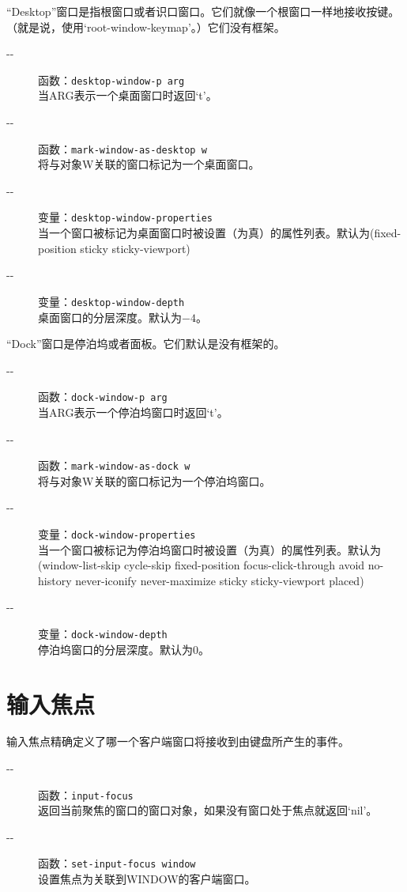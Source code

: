 \documentclass{book}
\begin{document}
\begin{CJK*}{UTF8}{gbsn}
``Desktop''窗口是指根窗口或者识口窗口。它们就像一个根窗口一样地接收按键。（就是说，使用`root-window-keymap'。）它们没有框架。
\begin{description}
\item[-{}-] 函数：\verb|desktop-window-p arg|\\
当ARG表示一个桌面窗口时返回`t'。
\item[-{}-] 函数：\verb|mark-window-as-desktop w|\\
将与对象W关联的窗口标记为一个桌面窗口。
\item[-{}-] 变量：\verb|desktop-window-properties|\\
当一个窗口被标记为桌面窗口时被设置（为真）的属性列表。默认为(fixed-position sticky sticky-viewport)
\item[-{}-] 变量：\verb|desktop-window-depth|\\
桌面窗口的分层深度。默认为$-4$。
\end{description}

``Dock''窗口是停泊坞或者面板。它们默认是没有框架的。
\begin{description}
\item[-{}-] 函数：\verb|dock-window-p arg|\\
当ARG表示一个停泊坞窗口时返回`t'。
\item[-{}-] 函数：\verb|mark-window-as-dock w|\\
将与对象W关联的窗口标记为一个停泊坞窗口。
\item[-{}-] 变量：\verb|dock-window-properties|\\
当一个窗口被标记为停泊坞窗口时被设置（为真）的属性列表。默认为(window-list-skip cycle-skip fixed-position focus-click-through avoid no-history never-iconify never-maximize sticky sticky-viewport placed)
\item[-{}-] 变量：\verb|dock-window-depth|\\
停泊坞窗口的分层深度。默认为0。
\end{description}
\section{输入焦点}
输入焦点精确定义了哪一个客户端窗口将接收到由键盘所产生的事件。
\begin{description}
\item[-{}-] 函数：\verb|input-focus|\\
返回当前聚焦的窗口的窗口对象，如果没有窗口处于焦点就返回`nil'。
\item[-{}-] 函数：\verb|set-input-focus window|\\
设置焦点为关联到WINDOW的客户端窗口。


\end{description}
\end{CJK*}
\end{document}
